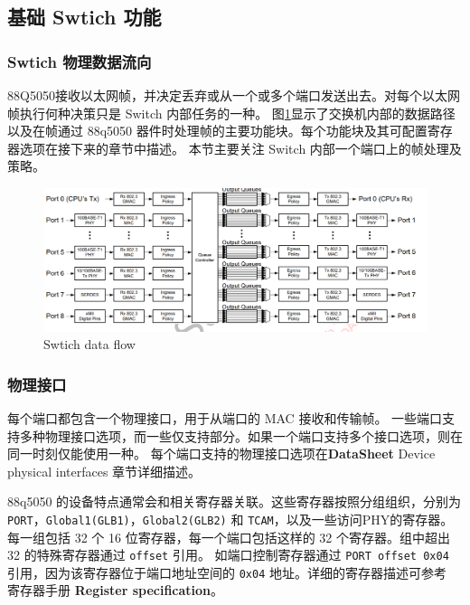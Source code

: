\subsection{基础 Swtich 功能}
\subsubsection{Swtich 物理数据流向}

88Q5050接收以太网帧，并决定丢弃或从一个或多个端口发送出去。对每个以太网帧执行何种决策只是 Switch 内部任务的一种。
图\ref{fig:data_flow}显示了交换机内部的数据路径以及在帧通过 88q5050 器件时处理帧的主要功能块。每个功能块及其可配置寄存器选项在接下来的章节中描述。
本节主要关注 Switch 内部一个端口上的帧处理及策略。

\begin{figure}[ht]
    \centering
    \includegraphics[scale=0.5]{pic/Snipaste_2021-10-24_16-16-48.png}
    \caption{Swtich data flow}
    \label{fig:data_flow}
\end{figure}

\subsubsection{物理接口}
每个端口都包含一个物理接口，用于从端口的 MAC 接收和传输帧。 一些端口支持多种物理接口选项，而一些仅支持部分。如果一个端口支持多个接口选项，则在同一时刻仅能使用一种。
每个端口支持的物理接口选项在\textbf{DataSheet} Device physical interfaces 章节详细描述。

\begin{note}
88q5050 的设备特点通常会和相关寄存器关联。这些寄存器按照分组组织，分别为 \lstinline{PORT}，\lstinline{Global1(GLB1)}，\lstinline{Global2(GLB2)} 和 \lstinline{TCAM}，以及一些访问PHY的寄存器。
每一组包括 32 个 16 位寄存器，每一个端口包括这样的 32 个寄存器。组中超出 32 的特殊寄存器通过 \lstinline{offset} 引用。
如端口控制寄存器通过 \lstinline{PORT offset 0x04} 引用，因为该寄存器位于端口地址空间的 \lstinline{0x04} 地址。详细的寄存器描述可参考 寄存器手册 \textbf{Register specification}。
\end{note}

